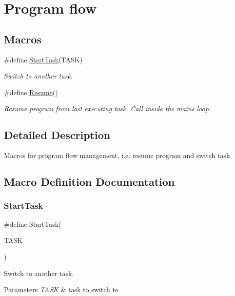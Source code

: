 \hypertarget{group__interpow__flow}{}\section{Program flow}
\label{group__interpow__flow}
\subsection*{Macros}
\begin{DoxyCompactItemize}
\item 
\#define \hyperlink{group__interpow__flow_gab22651082840dba6fa832a8b8bccaad9}{Start\+Task}(T\+A\+SK)
\begin{DoxyCompactList}\small\item\em Switch to another task. \end{DoxyCompactList}\item 
\mbox{\label{group__interpow__flow_gabda4bfc547f79e9818028956a6f8c43e}} 
\#define \hyperlink{group__interpow__flow_gabda4bfc547f79e9818028956a6f8c43e}{Resume}()
\begin{DoxyCompactList}\small\item\em Resume program from last executing task. Call inside the {\itshape main\textquotesingle{}s} loop. \end{DoxyCompactList}\end{DoxyCompactItemize}


\subsection{Detailed Description}
Macros for program flow management, i.\+e. resume program and switch task. 

\subsection{Macro Definition Documentation}
\mbox{\label{group__interpow__flow_gab22651082840dba6fa832a8b8bccaad9}} 
\subsubsection{\texorpdfstring{Start\+Task}{StartTask}}
{\footnotesize\ttfamily \#define Start\+Task(\begin{DoxyParamCaption}\item[{}]{T\+A\+SK }\end{DoxyParamCaption})}



Switch to another task. 


\begin{DoxyParams}{Parameters}
{\em T\+A\+SK} & task to switch to \\
\hline
\end{DoxyParams}
